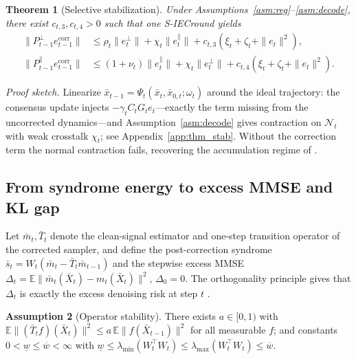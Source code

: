 \documentclass{article}
\theoremstyle{plain}
\newtheorem{theorem}{Theorem}[section]
\theoremstyle{definition}
\newtheorem{assumption}[theorem]{Assumption}
\theoremstyle{remark}
\newcommand{\SIEC}{\texorpdfstring{S\mbox{-}IEC\xspace}{S-IEC }}
\begin{document}
\begin{theorem}[Selective stabilization]\label{thm:stabilization}
Under Assumptions~\ref{asm:reg}--\ref{asm:decode}, there exist
\(c_{t,3},c_{t,4}>0\) such that one \SIEC round yields
\begin{align}
\|P_{t-1}^\perp e_{t-1}^{\mathrm{corr}}\| &\le \rho_t\|e_t^\perp\|
  + \chi_t\|e_t^\parallel\| + c_{t,3}(\xi_t+\zeta_t+\|e_t\|^2),
  \label{eq:stab_normal}\\
\|P_{t-1}^\parallel e_{t-1}^{\mathrm{corr}}\| &\le (1+\nu_t)\|e_t^\parallel\|
  + \chi_t\|e_t^\perp\| + c_{t,4}(\xi_t+\zeta_t+\|e_t\|^2).
  \label{eq:stab_tangent}
\end{align}
\end{theorem}

\emph{Proof sketch.} Linearize \(\bar x_{t-1} = \Psi_t(\bar x_t,\bar
x_{0,t};\omega_t)\) around the ideal trajectory: the consensus update
injects \(-\gamma_t C_t G_t e_t\)---exactly the term missing from the
uncorrected dynamics---and Assumption~\ref{asm:decode} gives contraction on
\(\mathcal{N}_t\) with weak crosstalk \(\chi_t\); see
Appendix~\ref{app:thm_stab}. Without the correction term the normal
contraction fails, recovering the accumulation regime of
\citep{zhong2026iec}.

\subsection{From syndrome energy to excess MMSE and KL gap}

Let \(\bar m_t, \bar T_t\) denote the clean-signal estimator and one-step
transition operator of the corrected sampler, and define the
post-correction syndrome \(\bar s_t = W_t(\bar m_t - \bar T_t \bar m_{t-1})\)
and the stepwise excess MMSE
\(\Delta_t = \mathbb{E}\|\bar m_t(\bar X_t) - m_t(\bar X_t)\|^2\),
\(\Delta_0 = 0\). The orthogonality principle gives that \(\Delta_t\) is
exactly the excess denoising risk at step \(t\)
\citep{guo2005immse,kong2023itdiffusion}.

\begin{assumption}[Operator stability]\label{asm:op}
There exists \(a\in[0,1)\) with
\(\mathbb{E}\|(\bar T_t f)(\bar X_t)\|^2 \le a\,\mathbb{E}\|f(\bar X_{t-1})\|^2\)
for all measurable \(f\); and constants \(0<\underline w\le\overline w<\infty\)
with \(\underline w \le \lambda_{\min}(W_t^\top W_t) \le
\lambda_{\max}(W_t^\top W_t) \le \overline w\).
\end{assumption}
\end{document}
